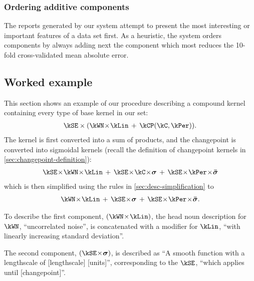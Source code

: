

\subsubsection{Ordering additive components}

The reports generated by our system attempt to present the most interesting or important features of a data set first.
As a heuristic, the system orders components by always adding next the component which most reduces the 10-fold cross-validated mean absolute error.



\subsection{Worked example}

This section shows an example of our procedure describing a compound kernel containing every type of base kernel in our set:
%
\begin{align}
\kSE \times (\kWN \kerntimes \kLin \kernplus \kCP(\kC, \kPer)).
\end{align}
%
The kernel is first converted into a sum of products, and the changepoint is converted into sigmoidal kernels (recall the definition of changepoint kernels in \cref{sec:changepoint-definition}):
%
\begin{align}
\kSE \kerntimes \kWN \kerntimes \kLin \kernplus 
\kSE \kerntimes \kC \kerntimes \boldsymbol{\sigma} \kernplus 
\kSE \kerntimes \kPer \kerntimes \boldsymbol{\bar\sigma}
\end{align}
%
which is then simplified using the rules in \cref{sec:desc-simplification} to
%
\begin{align}
\kWN \kerntimes \kLin \kernplus 
\kSE \kerntimes \boldsymbol{\sigma} \kernplus 
\kSE \kerntimes \kPer \kerntimes \boldsymbol{\bar\sigma}.
\end{align}

To describe the first component, $(\kWN \kerntimes \kLin)$, the head noun description for $\kWN$, ``uncorrelated noise'', is concatenated with a modifier for $\kLin$, ``with linearly increasing standard deviation''.

The second component, $(\kSE \kerntimes \vsigma)$, is described as ``A smooth function with a lengthscale of [lengthscale] [units]'', corresponding to the $\kSE$, ``which applies until [changepoint]''.

